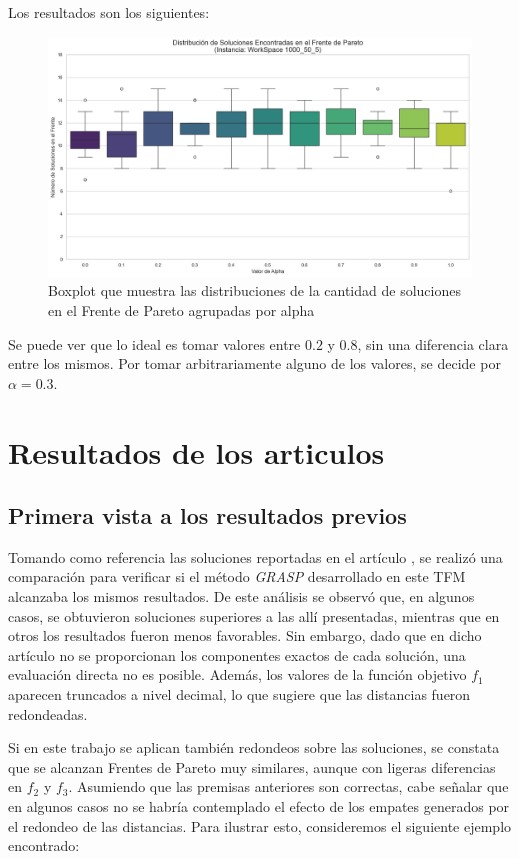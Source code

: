 \documentclass[12pt,a4paper]{book}
\begin{document}
Los resultados son los siguientes:

\begin{figure}[H]
    \centering
    \includegraphics[width=\linewidth]{images_finetuning/alpha_20_100}
    \caption{Boxplot que muestra las distribuciones de la cantidad de soluciones en el Frente de Pareto agrupadas por alpha}
    \label{fig:alpha}
\end{figure}

Se puede ver que lo ideal es tomar valores entre $0.2$ y $0.8$, sin una diferencia clara entre los mismos. Por tomar arbitrariamente alguno de los valores, se decide por $\alpha=0.3$.

\section{Resultados de los articulos}

\subsection{Primera vista a los resultados previos}
\label{sec:articulo2}
Tomando como referencia las soluciones reportadas en el artículo \cite{k-Balanced_2}, se realizó una comparación para verificar si el método \textit{GRASP} desarrollado en este TFM alcanzaba los mismos resultados. De este análisis se observó que, en algunos casos, se obtuvieron soluciones superiores a las allí presentadas, mientras que en otros los resultados fueron menos favorables.
Sin embargo, dado que en dicho artículo no se proporcionan los componentes exactos de cada solución, una evaluación directa no es posible. 
Además, los valores de la función objetivo $f_1$ aparecen truncados a nivel decimal, lo que sugiere que las distancias fueron redondeadas.

Si en este trabajo se aplican también redondeos sobre las soluciones, se constata que se alcanzan Frentes de Pareto muy similares, aunque con ligeras diferencias en $f_2$ y $f_3$. Asumiendo que las premisas anteriores son correctas, cabe señalar que en algunos casos no se habría contemplado el efecto de los empates generados por el redondeo de las distancias. Para ilustrar esto, consideremos el siguiente ejemplo encontrado:
\end{document}
